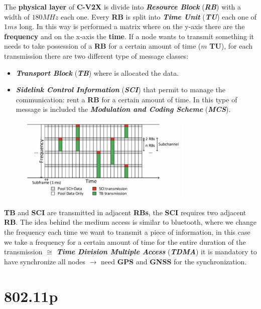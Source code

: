 The \textbf{physical layer} of \textbf{C-V2X} is divide into \textbf{\textit{Resource Block}} (\textbf{\textit{RB}}) with a width of $180MHz$ each one. Every \textbf{RB} is split into \textbf{\textit{Time Unit}} (\textbf{\textit{TU}}) each one of $1ms$ long. In this way is performed a matrix where on the y-axis there are the \textbf{frequency} and on the x-axis the \textbf{time}. If a node wants to transmit something it needs to take possession of a \textbf{RB} for a certain amount of time ($m$ \textbf{TU}), for each transmission there are two different type of message classes:
\begin{itemize}[nosep]
    \item \textbf{\textit{Transport Block}} (\textbf{\textit{TB}}) where is allocated the data.
    \item \textbf{\textit{Sidelink Control Information}} (\textbf{\textit{SCI}}) that permit to manage the communication: rent a \textbf{RB} for a certain amount of time. In this type of message is included the \textbf{\textit{Modulation and Coding Scheme}} (\textbf{\textit{MCS}}).
\end{itemize}

\begin{figure}[h]
    \centering
    \includegraphics[width=0.75\textwidth]{img/cv2x}
\end{figure}
\textbf{TB} and \textbf{SCI} are transmitted in adjacent \textbf{RBs}, the \textbf{SCI} requires two adjacent \textbf{RB}. The idea behind the medium access is similar to bluetooth, where we change the frequency each time we want to transmit a piece of information, in this case we take a frequency for a certain amount of time for the entire duration of the transmission $\cong$ \textbf{\textit{Time Division Multiple Access}} (\textbf{\textit{TDMA}}) it is mandatory to have synchronize all nodes $\rightarrow$ need \textbf{GPS} and \textbf{GNSS} for the synchronization.

\newpage
\section{802.11p}

